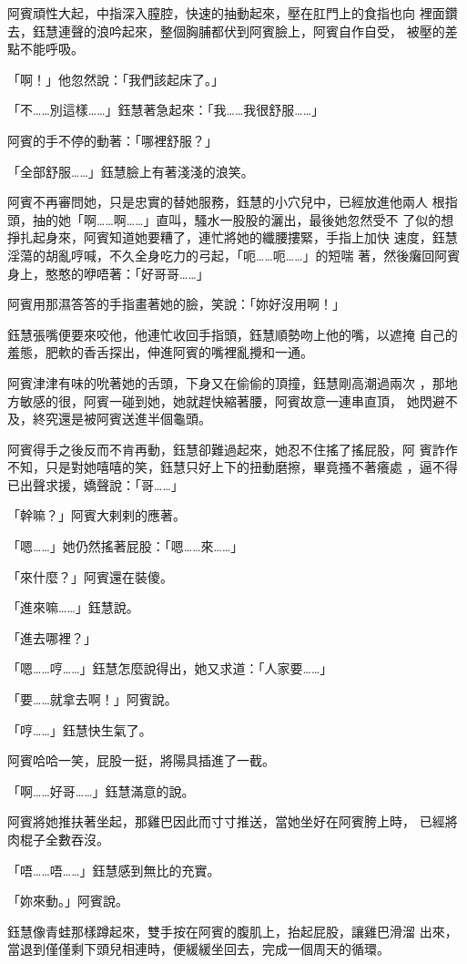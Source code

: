 阿賓頑性大起，中指深入膣腔，快速的抽動起來，壓在肛門上的食指也向
裡面鑽去，鈺慧連聲的浪吟起來，整個胸脯都伏到阿賓臉上，阿賓自作自受，
被壓的差點不能呼吸。

「啊！」他忽然說：「我們該起床了。」

「不……別這樣……」鈺慧著急起來：「我……我很舒服……」

阿賓的手不停的動著：「哪裡舒服？」

「全部舒服……」鈺慧臉上有著淺淺的浪笑。

阿賓不再審問她，只是忠實的替她服務，鈺慧的小穴兒中，已經放進他兩人
根指頭，抽的她「啊……啊……」直叫，騷水一股股的灑出，最後她忽然受不
了似的想掙扎起身來，阿賓知道她要糟了，連忙將她的纖腰摟緊，手指上加快
速度，鈺慧淫蕩的胡亂哼喊，不久全身吃力的弓起，「呃……呃……」的短喘
著，然後癱回阿賓身上，憨憨的咿唔著：「好哥哥……」

阿賓用那濕答答的手指畫著她的臉，笑說：「妳好沒用啊！」

鈺慧張嘴便要來咬他，他連忙收回手指頭，鈺慧順勢吻上他的嘴，以遮掩
自己的羞態，肥軟的香舌探出，伸進阿賓的嘴裡亂攪和一通。

阿賓津津有味的吮著她的舌頭，下身又在偷偷的頂撞，鈺慧剛高潮過兩次
，那地方敏感的很，阿賓一碰到她，她就趕快縮著腰，阿賓故意一連串直頂，
她閃避不及，終究還是被阿賓送進半個龜頭。

阿賓得手之後反而不肯再動，鈺慧卻難過起來，她忍不住搖了搖屁股，阿
賓詐作不知，只是對她嘻嘻的笑，鈺慧只好上下的扭動磨擦，畢竟搔不著癢處
，逼不得已出聲求援，嬌聲說：「哥……」

「幹嘛？」阿賓大剌剌的應著。

「嗯……」她仍然搖著屁股：「嗯……來……」

「來什麼？」阿賓還在裝傻。

「進來嘛……」鈺慧說。

「進去哪裡？」

「嗯……哼……」鈺慧怎麼說得出，她又求道：「人家要……」

「要……就拿去啊！」阿賓說。

「哼……」鈺慧快生氣了。

阿賓哈哈一笑，屁股一挺，將陽具插進了一截。

「啊……好哥……」鈺慧滿意的說。

阿賓將她推扶著坐起，那雞巴因此而寸寸推送，當她坐好在阿賓胯上時，
已經將肉棍子全數吞沒。

「唔……唔……」鈺慧感到無比的充實。

「妳來動。」阿賓說。

鈺慧像青蛙那樣蹲起來，雙手按在阿賓的腹肌上，抬起屁股，讓雞巴滑溜
出來，當退到僅僅剩下頭兒相連時，便緩緩坐回去，完成一個周天的循環。

